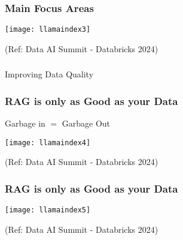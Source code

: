 \begin{frame}[fragile]\frametitle{Main Focus Areas}

\begin{center}
\texttt{[image: llamaindex3]}

{\tiny (Ref: Data AI Summit - Databricks 2024)}
\end{center}
\end{frame}

\begin{frame}[fragile]\frametitle{}
\begin{center}
{\Large Improving Data Quality}
\end{center}
\end{frame}

\begin{frame}[fragile]\frametitle{RAG is only as Good as your Data}

Garbage in $=$ Garbage Out

\begin{center}
\texttt{[image: llamaindex4]}

{\tiny (Ref: Data AI Summit - Databricks 2024)}
\end{center}
\end{frame}


\begin{frame}[fragile]\frametitle{RAG is only as Good as your Data}


\begin{center}
\texttt{[image: llamaindex5]}

{\tiny (Ref: Data AI Summit - Databricks 2024)}
\end{center}
\end{frame}


